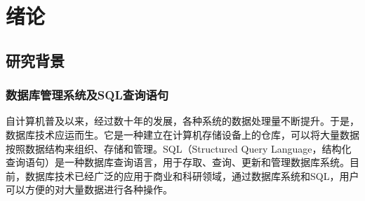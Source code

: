 




\chapter{绪论}
\label{chap:intro}
\section{研究背景}
\label{intro:background}
\subsection{数据库管理系统及SQL查询语句}
\label{intro:dbmssql}
自计算机普及以来，经过数十年的发展，各种系统的数据处理量不断提升。于是，数据库技术应运而生。它是一种建立在计算机存储设备上的仓库，可以将大量数据按照数据结构来组织、存储和管理。SQL（Structured Query Language，结构化查询语句）是一种数据库查询语言，用于存取、查询、更新和管理数据库系统。目前，数据库技术已经广泛的应用于商业和科研领域，通过数据库系统和SQL，用户可以方便的对大量数据进行各种操作。

